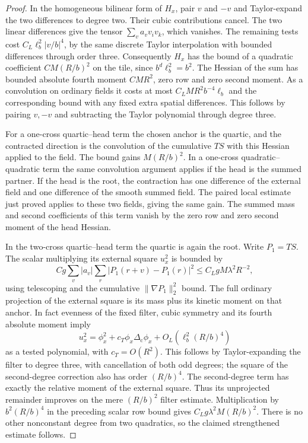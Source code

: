 \documentclass[11pt]{article}
\theoremstyle{definition}
\begin{document}
\begin{proof}
In the homogeneous bilinear form of \(H_x\), pair \(v\) and
\(-v\) and Taylor-expand the two differences to degree two.
Their cubic contributions cancel. The two linear differences
give the tensor \(\sum_v a_v v_i v_k\), which vanishes.
The remaining tests cost
\(C_L \ell_b^2 |v/b|^4\), by the same discrete Taylor
interpolation with bounded differences through order three.
Consequently \(H_x\) has the bound of a
quadratic coefficient \(C M(R/b)^2\) on the tile,
since \(b^d\ell_b^2=b^2\).
The Hessian of the sum has bounded absolute fourth moment
\(C M R^2\), zero row and zero second moment. As a convolution
on ordinary fields it costs at most \(C_L M R^2 b^{-4}\ell_b\)
and the corresponding bound with any fixed extra
spatial differences. This follows by pairing \(v,-v\)
and subtracting the Taylor polynomial through degree three.

For a one-cross quartic--head term the chosen anchor is
the quartic, and the contracted direction is the convolution
of the cumulative \(TS\) with this Hessian applied to the
field. The bound gains \(M(R/b)^2\).
In a one-cross quadratic--quadratic term the same
convolution argument applies if the head is the summed
partner. If the head is the root, the contraction has
one difference of the external field and one difference of
the smooth summed field. The paired local estimate just
proved applies to these two fields, giving the same gain.
The summed mass and second coefficients of this term
vanish by the zero row and zero second moment of the
head Hessian.

In the two-cross quartic--head term the quartic is again
the root. Write \(P_1=TS\). The scalar multiplying its
external square \(u_x^2\) is bounded by
\begin{equation}
 C g\sum_v|a_v|\sum_r|P_1(r+v)-P_1(r)|^2
      \le C_L g M\lambda^2 R^{-2},
\end{equation}
using telescoping and the cumulative
\(\|\nabla P_1\|_2^2\) bound.
The full ordinary projection of the external square is
its mass plus its kinetic moment on that anchor. In fact
evenness of the fixed filter, cubic symmetry and its
fourth absolute moment imply
\begin{equation}
 u_x^2=\phi_x^2+c_T\phi_x\Delta_{\mathrm c}\phi_x+
             O_L(\ell_b^2(R/b)^4)
\end{equation}
as a tested polynomial, with \(c_T=O(R^2)\).
This follows by Taylor-expanding the filter to degree
three, with cancellation of both odd degrees; the square
of the second-degree correction also has order
\((R/b)^4\). The second-degree term has exactly the
relative moment of the external square. Thus its
unprojected remainder improves on the mere
\((R/b)^2\) filter estimate. Multiplication by
\(b^2(R/b)^4\) in the preceding scalar row bound
gives \(C_Lg\lambda^2 M(R/b)^2\).
There is no other nonconstant degree from two quadratics,
so the claimed strengthened estimate follows.


\end{proof}
\end{document}
